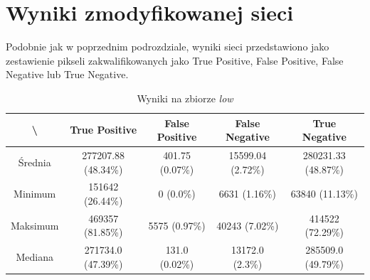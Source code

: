 \newpage
\section{Wyniki zmodyfikowanej sieci}
\label{sec:wyniki_zmodyfikowanej}

Podobnie jak w poprzednim podrozdziale, wyniki sieci przedstawiono jako zestawienie pikseli zakwalifikowanych jako True Positive, False Positive, False Negative lub True Negative.

\begin{table}[!h]
	\centering
	\caption{Wyniki na zbiorze \textit{low}}
	\vspace{6pt}
	{\footnotesize
		\begin{tabular}{|c|c|c|c|c|}
			\hline \textbackslash & True Positive & False Positive & False Negative & True Negative \\
      \hline Średnia & 277207.88 (48.34\%) & 401.75 (0.07\%) & 15599.04 (2.72\%) & 280231.33 (48.87\%) \\
      \hline Minimum & 151642 (26.44\%) & 0 (0.0\%) & 6631 (1.16\%) & 63840 (11.13\%) \\
      \hline Maksimum & 469357 (81.85\%) & 5575 (0.97\%) & 40243 (7.02\%) & 414522 (72.29\%) \\
      \hline Mediana & 271734.0 (47.39\%) & 131.0 (0.02\%) & 13172.0 (2.3\%) & 285509.0 (49.79\%) \\
      \hline
		\end{tabular}
	}
	\vspace{0pt}
\end{table}

\vspace{1cm}

